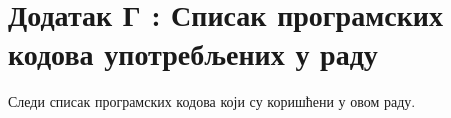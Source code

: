 \appendix
\setcounter{secnumdepth}{0}
\section{Додатак Г : Списак програмских кодова употребљених у раду}

Следи списак програмских кодова који су коришћени у овом раду.

\lstlistoflistings

